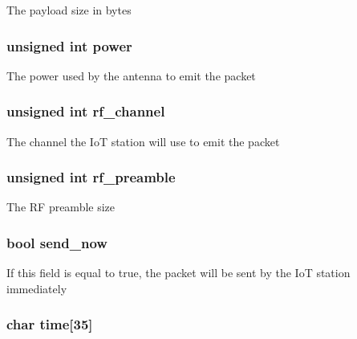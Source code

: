 The payload size in bytes \hypertarget{structdownstream__packet_a59104ad6aeccc2a5011202486a11959f}{
\subsubsection[{power}]{\setlength{\rightskip}{0pt plus 5cm}unsigned int power}}\label{structdownstream__packet_a59104ad6aeccc2a5011202486a11959f}
The power used by the antenna to emit the packet \hypertarget{structdownstream__packet_a566a9646361d592aa0be3fe468b29aad}{
\subsubsection[{rf\-\_\-channel}]{\setlength{\rightskip}{0pt plus 5cm}unsigned int rf\-\_\-channel}}\label{structdownstream__packet_a566a9646361d592aa0be3fe468b29aad}
The channel the Io\-T station will use to emit the packet \hypertarget{structdownstream__packet_a4f552d54b9b164e0e8677ba5e591c84c}{
\subsubsection[{rf\-\_\-preamble}]{\setlength{\rightskip}{0pt plus 5cm}unsigned int rf\-\_\-preamble}}\label{structdownstream__packet_a4f552d54b9b164e0e8677ba5e591c84c}
The R\-F preamble size \hypertarget{structdownstream__packet_a2233496db347682f0b4005fe07310c58}{
\subsubsection[{send\-\_\-now}]{\setlength{\rightskip}{0pt plus 5cm}bool send\-\_\-now}}\label{structdownstream__packet_a2233496db347682f0b4005fe07310c58}
If this field is equal to true, the packet will be sent by the Io\-T station immediately \hypertarget{structdownstream__packet_a7ba42be95635137cb867f08c8aa01f3b}{
\subsubsection[{time}]{\setlength{\rightskip}{0pt plus 5cm}char time\mbox{[}35\mbox{]}}}\label{structdownstream__packet_a7ba42be95635137cb867f08c8aa01f3b}
